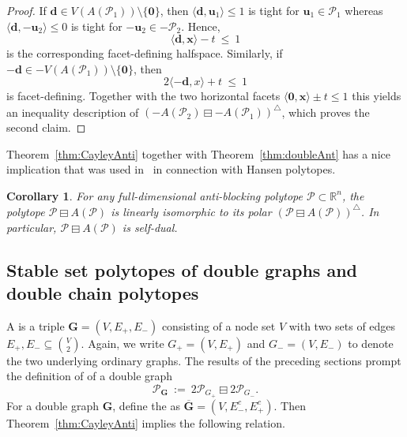 \documentclass[11pt]{amsart}
\newtheorem{cor}[thm]{Corollary}
\theoremstyle{definition}
\begin{document}
\begin{proof}
    If ${\mathbf{d}} \in V({A({{{\mathcal{P}}_1}})}) \setminus \{{\mathbf{0}}\}$, then ${\langle{{{\mathbf{d}},{\mathbf{u}}_1}}\rangle} \le 1$
    is tight for ${\mathbf{u}}_1 \in {\mathcal{P}}_1$ whereas ${\langle{{{\mathbf{d}},-{\mathbf{u}}_2}}\rangle} \le 0$ is tight
    for $-{\mathbf{u}}_2 \in -{\mathcal{P}}_2$.  Hence, 
    \[
        {\langle{{{\mathbf{d}},{\mathbf{x}}}}\rangle} - t \ \le \ 1
    \]
    is the corresponding facet-defining halfspace. Similarly, if $-{\mathbf{d}} \in
    -V({A({{{\mathcal{P}}_1}})}) \setminus \{{\mathbf{0}}\}$, then 
    \[
        2 {\langle{{-{\mathbf{d}},x}}\rangle} + t \ \le \ 1
    \]
    is facet-defining. Together with the two horizontal facets ${\langle{{{\mathbf{0}},{\mathbf{x}}}}\rangle}
    \pm t \le 1$ this yields an inequality description of
    $({{{-{A({{{\mathcal{P}}_2}})}} \boxminus {-{A({{{\mathcal{P}}_1}})}}}})^{\triangle}$, which proves the second
    claim.
\end{proof}

Theorem~\ref{thm:CayleyAnti} together with Theorem~\ref{thm:doubleAnt} has a
nice implication that was used in~\cite{WSZ} in connection with Hansen
polytopes.

\begin{cor}\label{cor:AB_selfdual}
    For any full-dimensional anti-blocking polytope ${\mathcal{P}} \subset {\mathbb{R}}^n$, the
    polytope ${{{\mathcal{P}} \boxminus {{A({{\mathcal{P}}})}}}}$ is linearly isomorphic to its polar 
    $({{{\mathcal{P}} \boxminus {{A({{\mathcal{P}}})}}}})^{\triangle}$. In particular, 
    ${{{\mathcal{P}} \boxminus {{A({{\mathcal{P}}})}}}}$ is self-dual.
\end{cor}

\subsection{Stable set polytopes of double graphs and double chain polytopes}
\label{ssec:double_graph}A {\textbf{\color{black}{double graph}}} is a triple ${\mathbf{G}} = (V,E_+,E_-)$ consisting of a node
set $V$ with two sets of edges $E_+,E_- \subseteq \binom{V}{2}$. Again, we
write $G_+ = (V, E_+)$ and $G_- = (V, E_-)$ to denote the two underlying
ordinary graphs.  The results of the preceding sections prompt the definition
of {\textbf{\color{black}{stable set polytope}}} of a double graph
\[
    {\mathcal{P}}_{\mathbf{G}} \ := \ {{{2{\mathcal{P}}_{G_+}} \boxminus {2{\mathcal{P}}_{G_-}}}}.
\]
For a double graph ${\mathbf{G}}$, define the {\textbf{\color{black}{complement graph}}} as
$\overline{\mathbf{G}} = (V,E_-^c,E_+^c)$. Then Theorem~\ref{thm:CayleyAnti}
implies the following relation.
\end{document}
